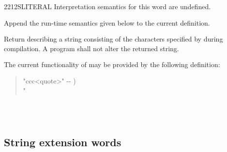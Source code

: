 \begin{worddef}{2212}{SLITERAL}
\interpret
	Interpretation semantics for this word are undefined.

\compile

	Append the run-time semantics given below to the current
	definition.

\runtime

	Return  describing a string consisting of
	the characters specified by  during
	compilation. A program shall not alter the returned string.

	\begin{rationale} %
		The current functionality of  may be
		provided by the following definition:

		\begin{quote}\ttfamily
			\word{:}   "ccc<quote>" -{}- ) \\
			\tab \word{[CHAR]} "  ~
				  \\
			\word{;} 
		\end{quote}
	\end{rationale}

	\begin{testing} %
		 \\
		 \\
	\end{testing}
\end{worddef}


\subsection{String extension words} %
\extended\vspace{1ex}

